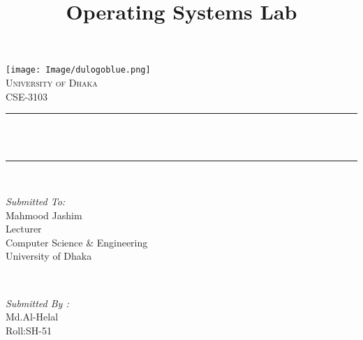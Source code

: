 \documentclass[12pt,a4paper]{article}
\title{Operating Systems Lab}                                %
\makeatletter
\let\thetitle\@title
\makeatother
\begin{document}

\begin{titlepage}
    \centering
    \vspace*{0.5 cm}
    \texttt{[image: Image/dulogoblue.png]}\\[1.0 cm]  %
    \textsc{\LARGE University of Dhaka}\\[2.0 cm]  %
    \textsc{\Large CSE-3103}\\[0.5 cm]               %
    \rule{\linewidth}{0.2 mm} \\[0.4 cm]
    { \huge \bfseries \thetitle}\\
    \rule{\linewidth}{0.2 mm} \\[1.5 cm]
    
    \begin{minipage}{0.6\textwidth}
        \begin{flushleft} \large
            \emph{Submitted To:}\\
            Mahmood Jashim\\
            Lecturer\\
            Computer Science \& Engineering\\University of Dhaka
            \end{flushleft}
            \end{minipage}~
            \begin{minipage}{0.4\textwidth}
            
            \begin{flushright} \large
            \emph{Submitted By :} \\
	    Md.Al-Helal\\
	    Roll:SH-51
        \end{flushright}
        
    \end{minipage}\\[2 cm]
\end{titlepage}
\end{document}
